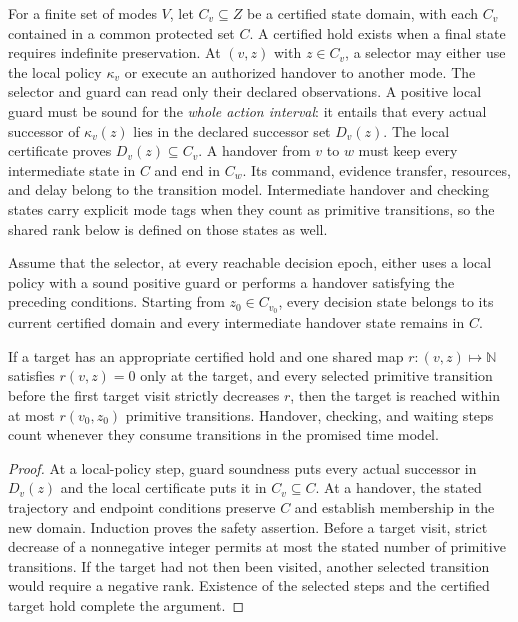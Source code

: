 For a finite set of modes $V$, let $C_v\subseteq Z$ be a certified state domain, with each $C_v$ contained in a common protected set $C$. A certified hold exists when a final state requires indefinite preservation. At $(v,z)$ with $z\in C_v$, a selector may either use the local policy $\kappa_v$ or execute an authorized handover to another mode. The selector and guard can read only their declared observations. A positive local guard must be sound for the \emph{whole action interval}: it entails that every actual successor of $\kappa_v(z)$ lies in the declared successor set $D_v(z)$. The local certificate proves $D_v(z)\subseteq C_v$. A handover from $v$ to $w$ must keep every intermediate state in $C$ and end in $C_w$. Its command, evidence transfer, resources, and delay belong to the transition model. Intermediate handover and checking states carry explicit mode tags when they count as primitive transitions, so the shared rank below is defined on those states as well.

\begin{MStheorem}\label{MS:thm:guarded-certificates}
Assume that the selector, at every reachable decision epoch, either uses a local policy with a sound positive guard or performs a handover satisfying the preceding conditions. Starting from $z_0\in C_{v_0}$, every decision state belongs to its current certified domain and every intermediate handover state remains in $C$.

If a target has an appropriate certified hold and one shared map $r:(v,z)\mapsto\mathbb N$ satisfies $r(v,z)=0$ only at the target, and every selected primitive transition before the first target visit strictly decreases $r$, then the target is reached within at most $r(v_0,z_0)$ primitive transitions. Handover, checking, and waiting steps count whenever they consume transitions in the promised time model.
\end{MStheorem}
\begin{proof}
At a local-policy step, guard soundness puts every actual successor in $D_v(z)$ and the local certificate puts it in $C_v\subseteq C$. At a handover, the stated trajectory and endpoint conditions preserve $C$ and establish membership in the new domain. Induction proves the safety assertion. Before a target visit, strict decrease of a nonnegative integer permits at most the stated number of primitive transitions. If the target had not then been visited, another selected transition would require a negative rank. Existence of the selected steps and the certified target hold complete the argument.
\end{proof}

